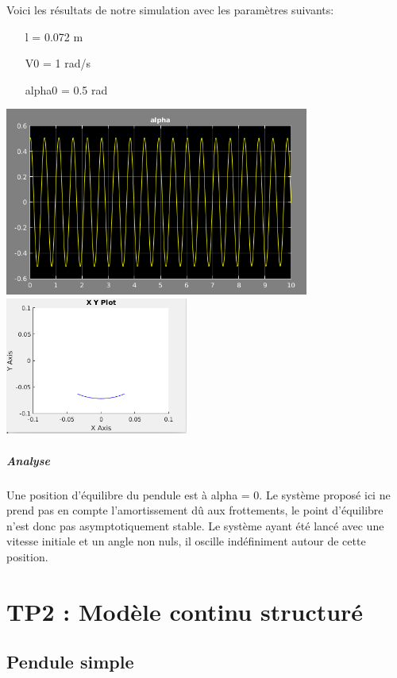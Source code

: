 \documentclass[a4paper,12pt]{article}
\begin{document}
\clearpage

Voici les résultats de notre simulation avec les paramètres suivants:
\
\begin{itemize}
\item[l = 0.072 m]
\item[V0 = 1 rad/s]
\item[alpha0 = 0.5 rad]
\end{itemize}

\begin{center}
\includegraphics[width=10cm]{./img/tp1_alpha.png}
\includegraphics[width=6cm]{./img/tp1_xy.png}
\end{center}

\subparagraph{Analyse}

Une position d'équilibre du pendule est à alpha = 0.
Le système proposé ici ne prend pas en compte l'amortissement dû aux frottements, le point d'équilibre n'est donc pas asymptotiquement stable. Le système ayant été lancé avec une vitesse initiale et un angle non nuls, il oscille indéfiniment autour de cette position.


\clearpage
\section{TP2 : Modèle continu structuré}
\subsection{Pendule simple}
\end{document}
